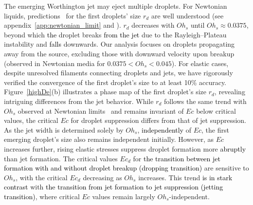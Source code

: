 \documentclass{jfm}
\newcommand{\DL}[1]{{\textcolor{black}{#1}}}
\newcommand{\VS}[1]{{\textcolor{black}{#1}}}
\newcommand{\AO}[1]{{\textcolor{black}{#1}}}
\newcommand{\KZ}[1]{{\textcolor{black}{#1}}}
\newcommand{\AKD}[1]{{\textcolor{black}{#1}}}
\newcommand{\oo}{\color{magenta} \normalfont}
\newcommand{\bb}{\color{black} \normalfont}
\begin{document}
The emerging Worthington jet may eject multiple droplets. For Newtonian liquids, \oo predictions\bb\, for the first droplets' size $r_d$ are well understood (see appendix~\ref{app:newtonian_limit} and \cite{ganan2017revision,blanco2020sea}). $r_d$ decreases with $Oh_s$ until $Oh_s \approx 0.0375$, beyond which \DL{the} droplet breaks \DL{from the jet} due to the Rayleigh--Plateau instability and \AKD{falls} downwards. Our analysis focuses on droplets propagating away from the source, excluding those with downward velocity upon breakup (observed in Newtonian media for $0.0375 < Oh_s < 0.045$). For elastic cases, despite unresolved filaments connecting droplets and jets, we have rigorously verified the convergence of the first droplet's size to at least 10\% accuracy.
Figure~\ref{highDe}(b) illustrates a phase map of the first droplet's size $r_d$, revealing intriguing differences from the jet behavior. While $r_d$ follows the same trend with $Oh_s$ \oo observed at Newtonian limits\bb\, and remains invariant of $Ec$ below critical values, the critical $Ec$ for droplet suppression differs from that of jet suppression. As the jet width is determined solely by $Oh_s$, \KZ{independently} of $Ec$, the first emerging droplet's size also remains independent initially. However, as $Ec$ increases further, rising elastic stresses suppress droplet formation more \AO{abruptly} than jet formation.
The critical values $Ec_d$ for \VS{the transition between jet formation with and without droplet breakup (dropping transition)} are sensitive to $Oh_s$, with the critical $Ec_d$ decreasing as $Oh_s$ increases. This trend \AO{is in stark contrast} with \VS{the transition from jet formation to jet suppression (jetting transition)}, where critical $Ec$ values remain largely $Oh_s$-independent.
\end{document}
